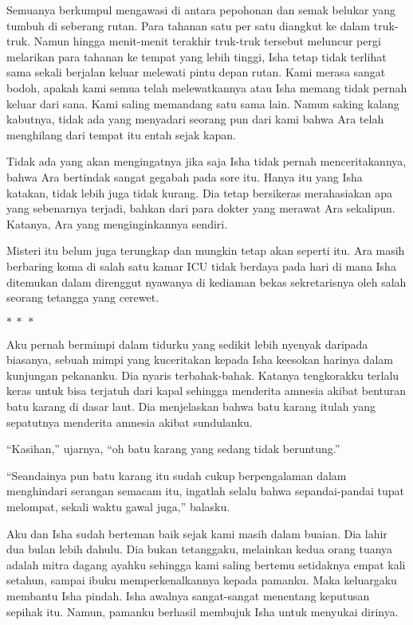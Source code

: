 \documentclass[smalldemyvopaper,11pt,twoside,onecolumn,openright,extrafontsizes]{memoir}
\newcommand\separator{
  \begin{center}
    \(\ast~\ast~\ast\)
  \end{center}
}
\begin{document}
Semuanya berkumpul mengawasi di antara pepohonan dan semak belukar yang tumbuh di seberang rutan. Para tahanan satu per satu diangkut ke dalam truk-truk. Namun hingga menit-menit terakhir truk-truk tersebut meluncur pergi melarikan para tahanan ke tempat yang lebih tinggi, Isha tetap tidak terlihat sama sekali berjalan keluar melewati pintu depan rutan. Kami merasa sangat bodoh, apakah kami semua telah melewatkannya atau Isha memang tidak pernah keluar dari sana. Kami saling memandang satu sama lain. Namun saking kalang kabutnya, tidak ada yang menyadari seorang pun dari kami bahwa Ara telah menghilang dari tempat itu entah sejak kapan.

Tidak ada yang akan mengingatnya jika saja Isha tidak pernah menceritakannya, bahwa Ara bertindak sangat gegabah pada sore itu. Hanya itu yang Isha katakan, tidak lebih juga tidak kurang. Dia tetap bersikeras merahasiakan apa yang sebenarnya terjadi, bahkan dari para dokter yang merawat Ara sekalipun. Katanya, Ara yang menginginkannya sendiri.


Misteri itu belum juga terungkap dan mungkin tetap akan seperti itu. Ara masih berbaring koma di salah satu kamar ICU tidak berdaya pada hari di mana Isha ditemukan dalam direnggut nyawanya di kediaman bekas sekretarisnya oleh salah seorang tetangga yang cerewet.

\separator{}


Aku pernah bermimpi dalam tidurku yang sedikit lebih nyenyak daripada biasanya, sebuah mimpi yang kuceritakan kepada Isha keesokan harinya dalam kunjungan pekananku. Dia nyaris terbahak-bahak. Katanya tengkorakku terlalu keras untuk bisa terjatuh dari kapal sehingga menderita amnesia akibat benturan batu karang di dasar laut. Dia menjelaskan bahwa batu karang itulah yang sepatutnya menderita amnesia akibat sundulanku.

``Kasihan,'' ujarnya, ``oh batu karang yang sedang tidak beruntung.''


``Seandainya pun batu karang itu sudah cukup berpengalaman dalam menghindari serangan semacam itu, ingatlah selalu bahwa sepandai-pandai tupat melompat, sekali waktu gawal juga,'' balasku.

Aku dan Isha sudah berteman baik sejak kami masih dalam buaian. Dia lahir dua bulan lebih dahulu. Dia bukan tetanggaku, melainkan kedua orang tuanya adalah mitra dagang ayahku sehingga kami saling bertemu setidaknya empat kali setahun, sampai ibuku memperkenalkannya kepada pamanku. Maka keluargaku membantu Isha pindah. Isha awalnya sangat-sangat menentang keputusan sepihak itu. Namun, pamanku berhasil membujuk Isha untuk menyukai dirinya.
\end{document}

